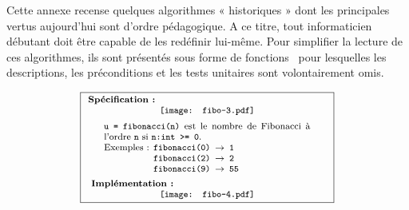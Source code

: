 
Cette annexe recense quelques algorithmes « historiques » 
dont les principales vertus aujourd'hui sont d'ordre pédagogique.
A ce titre, tout informaticien débutant doit être capable
de les redéfinir lui-même.
Pour simplifier la lecture de ces algorithmes,
ils sont présentés sous forme de fonctions \python\ pour
lesquelles les descriptions, les préconditions et les tests unitaires sont
volontairement omis. 

$$\framebox[8cm]{\begin{minipage}{7.5cm}\footnotesize
{\bf Spécification :}\\
\centerline{\texttt{[image: fibo-3.pdf]}}
$$\begin{minipage}{6.5cm}
{\tt u = fibonacci(n)} est le nombre de Fibonacci à l'ordre {\tt n} si {\tt n:int >= 0}.\\
Exemples : 
\begin{minipage}[t]{3cm}
{\tt fibonacci(0) $\rightarrow$ 1}\\{\tt fibonacci(2) $\rightarrow$ 2}\\{\tt fibonacci(9) $\rightarrow$ 55}
\end{minipage}
\end{minipage}$$

{\bf Implémentation :}\\
\centerline{\texttt{[image: fibo-4.pdf]}}
\end{minipage}}$$


